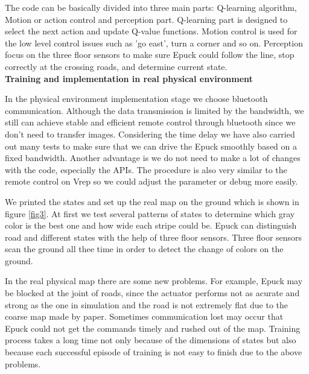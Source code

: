 \documentclass[a4paper, 11pt]{article} %
\begin{document}
The code can be basically divided
into three main parts: Q-learning algorithm, Motion or action control and
perception part. Q-learning part is designed to select the next action and update
Q-value functions. Motion control is used for the low level control issues such as
'go east', turn a corner and so on. Perception focus on the three floor sensors
to make sure Epuck could follow the line, stop correctly at the crossing roads,
and determine current state.
\\[3ex]
\textbf{Training and implementation in real physical environment}

In the physical environment implementation stage we choose bluetooth communication. Although the data transmission is limited by the bandwidth, we still can achieve stable and efficient remote control through bluetooth since we don't need to transfer images. Considering the time delay we have also carried out many tests to make sure that we can drive the Epuck smoothly based on a fixed bandwidth. Another advantage is we do not need to make a lot of changes with the code, especially the APIs. The procedure is also very similar to the remote control on Vrep so we could adjust the parameter or debug more easily.

We printed the states and set up the real map on the ground which is shown in figure \ref{fig3}. At first we test several patterns of states to determine which gray color is the best one and how wide each stripe could be. Epuck can distinguish road and different states with the help
of three floor sensors. Three floor sensors scan the ground all thee time in order to
detect the change of colors on the ground.

In the real physical map there are some new problems. For example, Epuck may be blocked at the joint of roads, since the actuator performs not as acurate and strong as the one in simulation and the road is not extremely flat due to the coarse map made by paper. Sometimes communication lost may occur that Epuck could not get the commands timely and rushed out of the map. Training process takes a long time not only because of the dimensions of states but also because each successful episode of training is not easy to finish due to the above problems.
\end{document}
